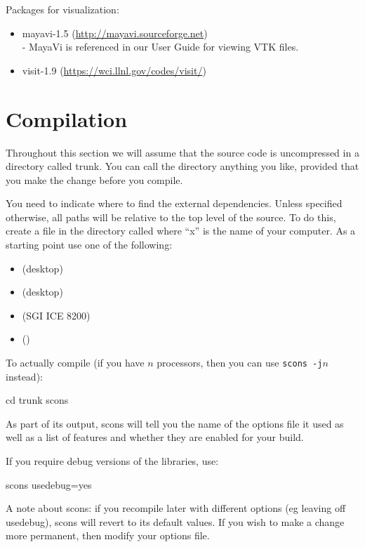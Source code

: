 Packages for visualization:
\begin{itemize}
 \item mayavi-1.5 (\url{http://mayavi.sourceforge.net}) \\-
    MayaVi is referenced in our User Guide for viewing VTK files.
 \item visit-1.9 (\url{https://wci.llnl.gov/codes/visit/})
\end{itemize}

\section{Compilation}
Throughout this section we will assume that the source code is uncompressed in a directory called trunk.
You can call the directory anything you like, provided that you make the change before you compile.

You need to indicate where to find the external dependencies.
Unless specified otherwise, all paths will be relative to the top level of the source.
To do this, create a file in the  directory called  where ``x'' is the name of your computer.
As a starting point use one of the following:
\begin{itemize}
 \item {} (\linux desktop)
\item {} (\macosx desktop)
\item {} (SGI ICE 8200)
\item {} (\winxp)
\end{itemize}

To actually compile (if you have $n$ processors, then you can use \texttt{scons -j$n$} instead):

\begin{shellCode}
cd trunk
scons
\end{shellCode}

As part of its output, scons will tell you the name of the options file it used as well as a list of features 
and whether they are enabled for your build.

If you require debug versions of the libraries, use:
\begin{shellCode}
 scons usedebug=yes
\end{shellCode}
A note about scons: if you recompile later with different options (eg leaving off usedebug), scons will revert 
to its default values. If you wish to make a change more permanent, then modify your options file.


